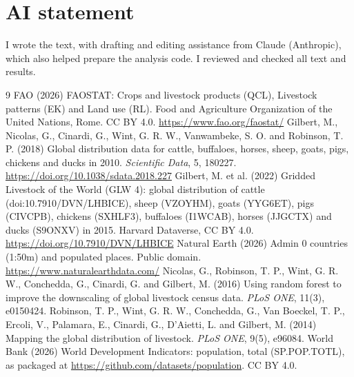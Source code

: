 \documentclass[11pt,a4paper]{article}
\begin{document}
\section*{AI statement}
I wrote the text, with drafting and editing assistance from Claude (Anthropic), which also helped prepare the analysis code. I reviewed and checked all text and results.

\begin{thebibliography}{9}
 FAO (2026) FAOSTAT: Crops and livestock products (QCL), Livestock patterns (EK) and Land use (RL). Food and Agriculture Organization of the United Nations, Rome. CC BY 4.0. \url{https://www.fao.org/faostat/}
 Gilbert, M., Nicolas, G., Cinardi, G., Wint, G. R. W., Vanwambeke, S. O. and Robinson, T. P. (2018) Global distribution data for cattle, buffaloes, horses, sheep, goats, pigs, chickens and ducks in 2010. \emph{Scientific Data}, 5, 180227. \url{https://doi.org/10.1038/sdata.2018.227}
 Gilbert, M. et al. (2022) Gridded Livestock of the World (GLW 4): global distribution of cattle (doi:10.7910/DVN/LHBICE), sheep (VZOYHM), goats (YYG6ET), pigs (CIVCPB), chickens (SXHLF3), buffaloes (I1WCAB), horses (JJGCTX) and ducks (S9ONXV) in 2015. Harvard Dataverse, CC BY 4.0. \url{https://doi.org/10.7910/DVN/LHBICE}
 Natural Earth (2026) Admin 0 countries (1:50m) and populated places. Public domain. \url{https://www.naturalearthdata.com/}
 Nicolas, G., Robinson, T. P., Wint, G. R. W., Conchedda, G., Cinardi, G. and Gilbert, M. (2016) Using random forest to improve the downscaling of global livestock census data. \emph{PLoS ONE}, 11(3), e0150424.
 Robinson, T. P., Wint, G. R. W., Conchedda, G., Van Boeckel, T. P., Ercoli, V., Palamara, E., Cinardi, G., D'Aietti, L. and Gilbert, M. (2014) Mapping the global distribution of livestock. \emph{PLoS ONE}, 9(5), e96084.
 World Bank (2026) World Development Indicators: population, total (SP.POP.TOTL), as packaged at \url{https://github.com/datasets/population}. CC BY 4.0.
\end{thebibliography}
\end{document}
